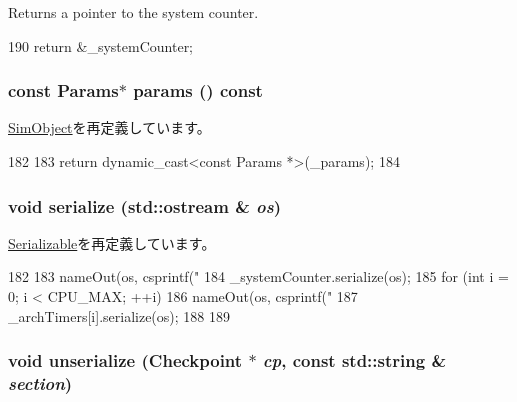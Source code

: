 Returns a pointer to the system counter. 


\begin{DoxyCode}
190 { return &_systemCounter; }
\end{DoxyCode}
\hypertarget{classGenericTimer_acd3c3feb78ae7a8f88fe0f110a718dff}{
\subsubsection[{params}]{\setlength{\rightskip}{0pt plus 5cm}const {\bf Params}$\ast$ params () const}}
\label{classGenericTimer_acd3c3feb78ae7a8f88fe0f110a718dff}


\hyperlink{classSimObject_acd3c3feb78ae7a8f88fe0f110a718dff}{SimObject}を再定義しています。


\begin{DoxyCode}
182     {
183         return dynamic_cast<const Params *>(_params);
184     }
\end{DoxyCode}
\hypertarget{classGenericTimer_a53e036786d17361be4c7320d39c99b84}{
\subsubsection[{serialize}]{\setlength{\rightskip}{0pt plus 5cm}void serialize (std::ostream \& {\em os})}}
\label{classGenericTimer_a53e036786d17361be4c7320d39c99b84}


\hyperlink{classSerializable_ad6272f80ae37e8331e3969b3f072a801}{Serializable}を再定義しています。


\begin{DoxyCode}
182 {
183     nameOut(os, csprintf("%
184     _systemCounter.serialize(os);
185     for (int i = 0; i < CPU_MAX; ++i) {
186         nameOut(os, csprintf("%
187         _archTimers[i].serialize(os);
188     }
189 }
\end{DoxyCode}
\hypertarget{classGenericTimer_af22e5d6d660b97db37003ac61ac4ee49}{
\subsubsection[{unserialize}]{\setlength{\rightskip}{0pt plus 5cm}void unserialize ({\bf Checkpoint} $\ast$ {\em cp}, \/  const std::string \& {\em section})}}
\label{classGenericTimer_af22e5d6d660b97db37003ac61ac4ee49}


